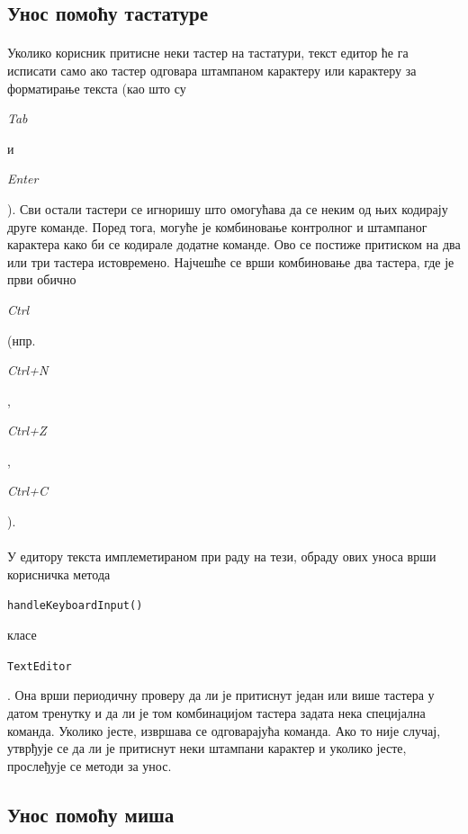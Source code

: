 \documentclass[12pt,oneside]{memoir}
\begin{document}
\subsection{Унос помоћу тастатуре}
\paragraph{}
Уколико корисник притисне неки тастер на тастатури, текст едитор ће га исписати само
ако тастер одговара штампаном карактеру или карактеру за форматирање текста (као што
су \begin{latinica}\textit{Tab}\end{latinica} и \begin{latinica}\textit{Enter}\end{latinica}). Сви остали тастери се игноришу
што омогућава да се неким од њих кодирају друге команде. 
Поред тога, могуће је комбиновање контролног и штампаног карактера како
би се кодирале додатне команде. Ово се постиже притиском на два или три тастера истовремено. Најчешће се врши комбиновање два тастера, где је први обично \begin{latinica}\textit{Ctrl}\end{latinica} (нпр. 
\begin{latinica}\textit{Ctrl+N}\end{latinica}, \begin{latinica}\textit{Ctrl+Z}\end{latinica},
\begin{latinica}\textit{Ctrl+C}\end{latinica}).

\paragraph{}
У едитору текста имплеметираном при раду на тези, обраду ових уноса врши корисничка метода \begin{latinica}\verb|handleKeyboardInput()|\end{latinica} класе
\begin{latinica}\verb|TextEditor|\end{latinica}. Она врши периодичну проверу да ли
је притиснут један или више тастера у датом тренутку и да ли је том комбинацијом тастера 
задата нека специјална команда. Уколико јесте, извршава се одговарајућа команда. Ако
то није случај, утврђује се да ли је притиснут неки штампани карактер и уколико јесте,
прослеђује се методи за унос.


\subsection{Унос помоћу миша}
\end{document}
